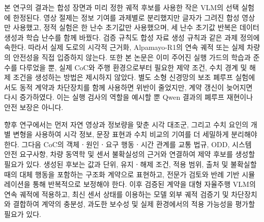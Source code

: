 본 연구의 결과는 합성 장면과 미리 정한 궤적 후보를 사용한 작은 VLM의 선택 실험에 한정된다. 영상 절제는 정보 기여를 과제별로 분리했지만 글자가 그려진 합성 영상만 사용했고, 정적 실험은 한 난수 초기값만 사용했으며, 세 난수 초기값 반복은 데이터 생성과 학습 난수를 함께 바꿨다. 검증 규칙도 합성 자료 생성 규칙과 같은 과제 정의에 속한다. 따라서 실제 도로의 시각적 근거화, Alpamayo-R1의 연속 궤적 또는 실제 차량의 안전성을 직접 입증하지 않는다. 또한 본 논문은 이미 주어진 실행 가드의 학습과 준수를 다루었을 뿐, 실제 CoC와 주행 환경으로부터 필요한 제약 조건, 수치 경계 및 해제 조건을 생성하는 방법은 제시하지 않았다. 별도 소형 신경망의 보조 폐루프 실험에서도 동적 계약과 차단장치를 함께 사용하면 위반이 줄었지만, 계약 갱신이 늦어지면 다시 증가하였다. 이는 실행 검사의 역할을 예시할 뿐 Qwen 결과의 폐루프 재현이나 안전 보장은 아니다.


향후 연구에서는 먼저 자연 영상과 정보량을 맞춘 시각 대조군, 그리고 수치 요인의 개별 변형을 사용하여 시각 정보, 문장 표현과 수치 비교의 기여를 더 세밀하게 분리해야 한다. 그다음 CoC의 객체ㆍ원인ㆍ요구 행동ㆍ시간 관계를 교통 법규, ODD, 시스템 안전 요구사항, 차량 동역학 및 센서 불확실성의 근거와 연결하여 제약 후보를 생성할 필요가 있다. 생성된 후보는 값과 단위, 유지ㆍ해제 조건, 적용 범위, 출처 및 불확실할 때의 대체 행동을 포함하는 구조화 계약으로 표현하고, 전문가 검토와 반례 기반 시뮬레이션을 통해 반복적으로 보정해야 한다. 이후 검증된 계약을 대형 자율주행 VLM의 연속 궤적에 적용하고, 최신 센서 상태를 이용하는 모델 외부 궤적 검증기 및 차단장치와 결합하여 계약의 충분성, 과도한 보수성 및 실제 환경에서의 적용 가능성을 평가할 필요가 있다.

